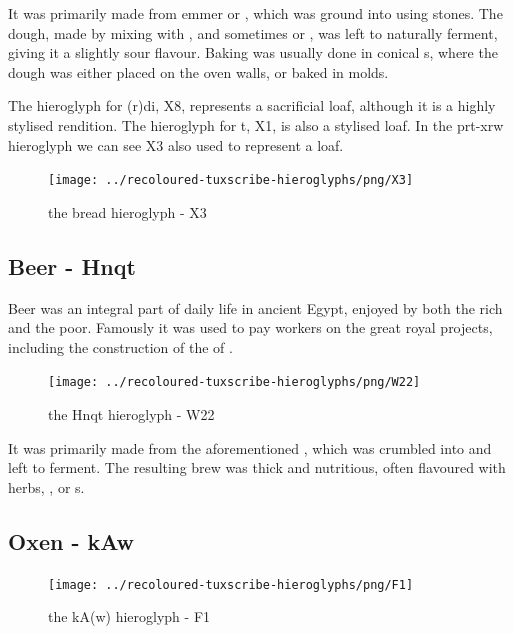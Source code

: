 It was primarily made from emmer  or , which was ground into  using stones. The dough, made by mixing with , and sometimes  or , was left to naturally ferment, giving it a slightly sour flavour. Baking was usually done in conical  s, where the dough was either placed on the oven walls, or baked in molds.

The hieroglyph for (r)di, X8, represents a sacrificial loaf, although it is a highly stylised rendition. The hieroglyph for t, X1, is also a stylised loaf. In the prt-xrw hieroglyph we can see X3 also used to represent a loaf.

\begin{figure} [H]
	\centering
	\texttt{[image: ../recoloured-tuxscribe-hieroglyphs/png/X3]}
	\caption{the bread hieroglyph - X3}
\end{figure}

\subsection*{Beer - Hnqt}

Beer was an integral part of daily life in ancient Egypt, enjoyed by both the rich and the poor. Famously it was used to pay workers on the great royal projects, including the construction of the  of .

\begin{figure} [H]
	\centering
	\texttt{[image: ../recoloured-tuxscribe-hieroglyphs/png/W22]}
	\caption{the Hnqt hieroglyph - W22}
\end{figure}

It was primarily made from the aforementioned , which was crumbled into  and left to ferment. The resulting brew was thick and nutritious, often flavoured with herbs, , or s.

\subsection*{Oxen - kAw}

\begin{figure} [H]
	\centering
	\texttt{[image: ../recoloured-tuxscribe-hieroglyphs/png/F1]}
	\caption{the kA(w) hieroglyph - F1}
\end{figure}

